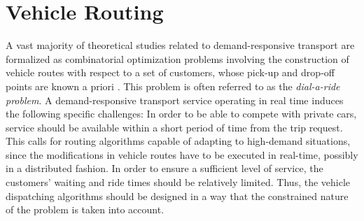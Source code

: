 \documentclass[dissertation,draft*]{aaltoseries}
\begin{document}





\chapter{Vehicle Routing}
\label{vehiclerouting}
A vast majority of theoretical studies related to demand-responsive transport are formalized as combinatorial
optimization problems involving the construction of vehicle routes with respect to
a set of customers, whose pick-up and drop-off points are known a priori \cite{toth03}.
This problem is often referred to as the \emph{dial-a-ride problem}.
A demand-responsive transport service operating in real time induces the following specific challenges: 
In order to be able to compete with private cars, service
should be available within a short period of time from the trip request.
This calls for routing algorithms capable of adapting to high-demand situations, since the modifications 
in vehicle routes have to be executed in real-time, possibly in a distributed fashion.
In order to ensure a sufficient level of service, the customers' waiting and ride times 
should be relatively limited. Thus, the vehicle dispatching algorithms should be designed
in a way that the constrained nature of the problem is taken into account.
\end{document}
